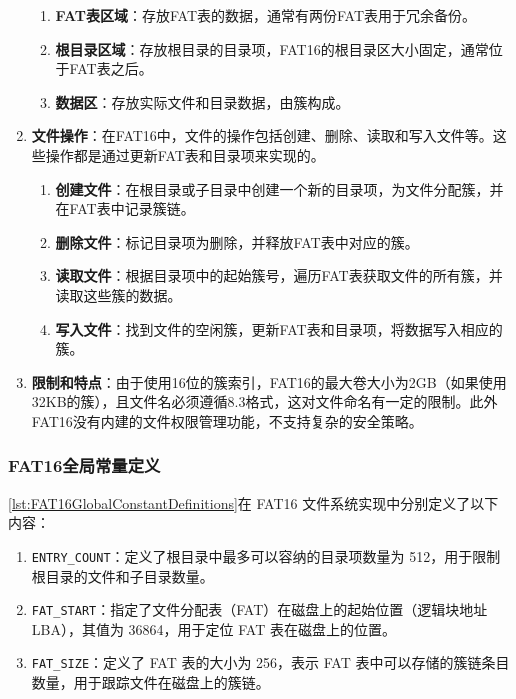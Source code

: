 \begin{enumerate}
\begin{enumerate}
              \item \textbf{FAT表区域}：存放FAT表的数据，通常有两份FAT表用于冗余备份。
              \item \textbf{根目录区域}：存放根目录的目录项，FAT16的根目录区大小固定，通常位于FAT表之后。
              \item \textbf{数据区}：存放实际文件和目录数据，由簇构成。
          \end{enumerate}
    \item \textbf{文件操作}：在FAT16中，文件的操作包括创建、删除、读取和写入文件等。这些操作都是通过更新FAT表和目录项来实现的。
          \begin{enumerate}
              \item \textbf{创建文件}：在根目录或子目录中创建一个新的目录项，为文件分配簇，并在FAT表中记录簇链。
              \item \textbf{删除文件}：标记目录项为删除，并释放FAT表中对应的簇。
              \item \textbf{读取文件}：根据目录项中的起始簇号，遍历FAT表获取文件的所有簇，并读取这些簇的数据。
              \item \textbf{写入文件}：找到文件的空闲簇，更新FAT表和目录项，将数据写入相应的簇。
          \end{enumerate}
    \item \textbf{限制和特点}：由于使用16位的簇索引，FAT16的最大卷大小为2GB（如果使用32KB的簇），且文件名必须遵循8.3格式，这对文件命名有一定的限制。此外FAT16没有内建的文件权限管理功能，不支持复杂的安全策略。
\end{enumerate}

\subsubsection{FAT16全局常量定义}

\cref{lst:FAT16GlobalConstantDefinitions}在 FAT16 文件系统实现中分别定义了以下内容：

\begin{enumerate}
    \item \texttt{ENTRY\_COUNT}：定义了根目录中最多可以容纳的目录项数量为 512，用于限制根目录的文件和子目录数量。
    \item \texttt{FAT\_START}：指定了文件分配表（FAT）在磁盘上的起始位置（逻辑块地址 LBA），其值为 36864，用于定位 FAT 表在磁盘上的位置。
    \item \texttt{FAT\_SIZE}：定义了 FAT 表的大小为 256，表示 FAT 表中可以存储的簇链条目数量，用于跟踪文件在磁盘上的簇链。
\end{enumerate}

